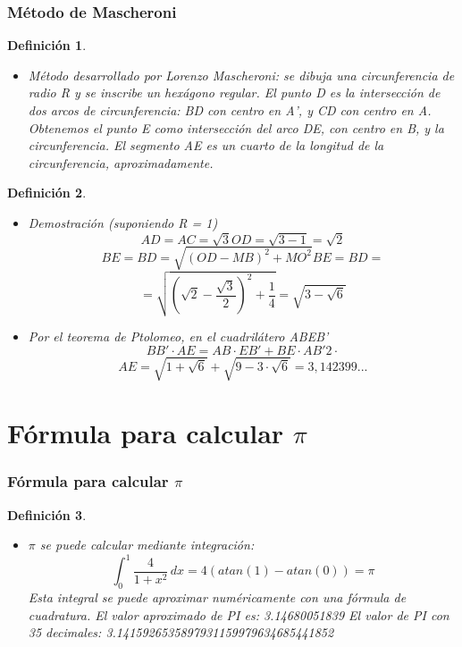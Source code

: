 \documentclass{beamer}
\newtheorem{definicion}{Definición}
\begin{document}
\begin{frame}
\frametitle{Método de Mascheroni}

\begin{definicion}
  \begin{itemize}
  \item
Método desarrollado por Lorenzo Mascheroni: se dibuja una circunferencia de radio R y
se inscribe un hexágono regular. El punto D es la intersección de dos arcos de
circunferencia: BD con centro en A', y CD con centro en A. Obtenemos el punto E como 
intersección del arco DE, con centro en B, y la circunferencia. El segmento AE es 
un cuarto de la longitud de la circunferencia, aproximadamente.
  
  \end{itemize}
\end{definicion}
\end{frame}
\begin{frame}
\begin{definicion}
  \begin{itemize}
  \item
Demostración (suponiendo R = 1)
$$AD=AC=\sqrt{3} OD=\sqrt{3-1}=\sqrt{2}$$
$$BE=BD=\sqrt{(OD-MB)^2+MO^2} BE=BD=$$
$$=\sqrt{\left( \sqrt{2}-\frac{\sqrt{3}}{2} \right)^2+\frac{1}{4}}=\sqrt{3-\sqrt{6}}$$\par
  \pause
  \item
Por el teorema de Ptolomeo, en el cuadrilátero ABEB'
$$BB' \cdot AE=AB \cdot EB' + BE \cdot AB'
2 \cdot $$
$$AE= \sqrt{1+\sqrt{6}}+\sqrt{9-3 \cdot \sqrt{6}}=3,142399...$$
  
  \end{itemize}
\end{definicion}

\end{frame}

\section{Fórmula para calcular $\pi$}

\begin{frame}
\frametitle{Fórmula para calcular $\pi$}
\begin{definicion}
  \begin{itemize}
  \item
$\pi$ se puede calcular mediante integración:
%
$$\int_{0}^{1} \! \frac{4}{1+x^2}\, dx = 4(atan(1) -atan(0)) = \pi $$
%
Esta integral se puede aproximar numéricamente con una fórmula de cuadratura.
El valor aproximado de PI es:  3.14680051839 
El valor de PI con 35 decimales: 3.1415926535897931159979634685441852\par
  \end{itemize}
\end{definicion}
\end{frame}
%
\end{document}
